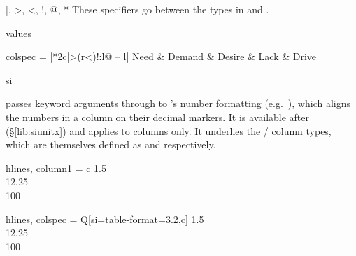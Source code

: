 \begin{codedescribe}[
    code,
    no index,
    new=2021B
  ]{|, >, <, !, @, *}
  These specifiers go between the types in  and .
  \begin{describelist*}{values}
  \end{describelist*}

  \begin{codestore}[st=types:specifiers]
    \begin{tblr}{
      colspec = {|*{2}{c|}>{(}r<{)}!{:}l@{ -- }l|}
      }
      Need & Demand & Desire & Lack & Drive
    \end{tblr}\end{codestore}
  \begin{center}
  \end{center}
\end{codedescribe}

\begin{codedescribe}[
    key,
    new=2021L
  ]{si}
  \begin{codesyntax}
  \end{codesyntax}
   passes keyword arguments through to 's number formatting (e.g.\ ), which aligns the numbers in a column on their decimal markers. It is available after  (\S\ref{lib:siunitx}) and applies to columns only. It underlies the / column types, which are themselves defined as  and  respectively.

  \begin{codestore}[st=types:si]
    \begin{tblr}{hlines, column{1} = {c}}
      1.5 \\ 12.25 \\ 100
    \end{tblr}\quad
    \begin{tblr}{
        hlines,
        colspec = {Q[si={table-format=3.2},c]}
      }
      1.5 \\ 12.25 \\ 100
    \end{tblr}\end{codestore}
  \begin{center}
  \end{center}
\end{codedescribe}

